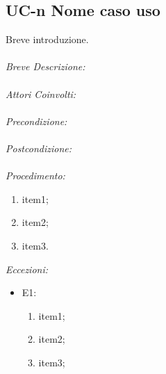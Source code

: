 \subsection{UC-n Nome caso uso}
Breve introduzione.
\\
\\
\textit{Breve Descrizione:} 
\\
\\
\textit{Attori Coinvolti:}
\\
\\
\textit{Precondizione:}
\\
\\
\textit{Postcondizione:}
\\
\\
\textit{Procedimento:}
\begin{enumerate}
	\item item1;
	\item item2;
	\item item3.
\end{enumerate}


\textit{Eccezioni:}
\begin{itemize}
	\item E1:
	\begin{enumerate}
		\item item1;
		\item item2;
		\item item3;
	\end{enumerate}
\end{itemize}
